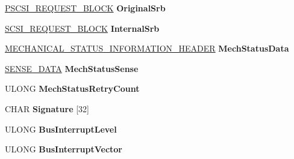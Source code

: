 \begin{DoxyCompactItemize}
\hyperlink{struct___s_c_s_i___r_e_q_u_e_s_t___b_l_o_c_k}{P\+S\+C\+S\+I\+\_\+\+R\+E\+Q\+U\+E\+S\+T\+\_\+\+B\+L\+O\+CK} {\bfseries Original\+Srb}
\item 
\mbox{\label{struct___h_w___d_e_v_i_c_e___e_x_t_e_n_s_i_o_n_aeda05dd55953628212eedb2f13396c87}} 
\hyperlink{struct___s_c_s_i___r_e_q_u_e_s_t___b_l_o_c_k}{S\+C\+S\+I\+\_\+\+R\+E\+Q\+U\+E\+S\+T\+\_\+\+B\+L\+O\+CK} {\bfseries Internal\+Srb}
\item 
\mbox{\label{struct___h_w___d_e_v_i_c_e___e_x_t_e_n_s_i_o_n_af1e401fc4370e7f8fdbfa11aba142a42}} 
\hyperlink{struct___m_e_c_h_a_n_i_c_a_l___s_t_a_t_u_s___i_n_f_o_r_m_a_t_i_o_n___h_e_a_d_e_r}{M\+E\+C\+H\+A\+N\+I\+C\+A\+L\+\_\+\+S\+T\+A\+T\+U\+S\+\_\+\+I\+N\+F\+O\+R\+M\+A\+T\+I\+O\+N\+\_\+\+H\+E\+A\+D\+ER} {\bfseries Mech\+Status\+Data}
\item 
\mbox{\label{struct___h_w___d_e_v_i_c_e___e_x_t_e_n_s_i_o_n_a0f11c33cee7e55a10fe2ba1aae14e28d}} 
\hyperlink{struct___s_e_n_s_e___d_a_t_a}{S\+E\+N\+S\+E\+\_\+\+D\+A\+TA} {\bfseries Mech\+Status\+Sense}
\item 
\mbox{\label{struct___h_w___d_e_v_i_c_e___e_x_t_e_n_s_i_o_n_a93e7af8333890d8a0de39f529664f364}} 
U\+L\+O\+NG {\bfseries Mech\+Status\+Retry\+Count}
\item 
\mbox{\label{struct___h_w___d_e_v_i_c_e___e_x_t_e_n_s_i_o_n_a6c5d08e7b3a993a9e4dfc38f315f3bd6}} 
C\+H\+AR {\bfseries Signature} \mbox{[}32\mbox{]}
\item 
\mbox{\label{struct___h_w___d_e_v_i_c_e___e_x_t_e_n_s_i_o_n_a3209c511f4139a44bc68c59f4bead2d9}} 
U\+L\+O\+NG {\bfseries Bus\+Interrupt\+Level}
\item 
\mbox{\label{struct___h_w___d_e_v_i_c_e___e_x_t_e_n_s_i_o_n_a27132dd0aeafe267a4ea185f28d82d0b}} 
U\+L\+O\+NG {\bfseries Bus\+Interrupt\+Vector}
\item 
\mbox{\label{struct___h_w___d_e_v_i_c_e___e_x_t_e_n_s_i_o_n_af94af25cf2e683d2ef5643186bb19a70}} 

\end{DoxyCompactItemize}
